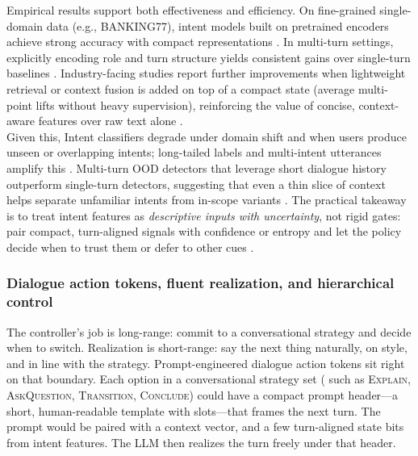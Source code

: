 \documentclass[12pt]{article}
\begin{document}
Empirical results support both effectiveness and efficiency. On fine-grained single-domain data (e.g., BANKING77), intent models built on pretrained encoders achieve strong accuracy with compact representations \citep{casanueva2020banking77}. In multi-turn settings, explicitly encoding role and turn structure yields consistent gains over single-turn baselines \citep{zhang2021dialoguebert}. Industry-facing studies report further improvements when lightweight retrieval or context fusion is added on top of a compact state (average multi-point lifts without heavy supervision), reinforcing the value of concise, context-aware features over raw text alone \citep{liu2024lara}.\\

 Given this, Intent classifiers degrade under domain shift and when users produce unseen or overlapping intents; long-tailed labels and multi-intent utterances amplify this \citep{larson2019evaluating,casanueva2020banking77}. Multi-turn OOD detectors that leverage short dialogue history outperform single-turn detectors, suggesting that even a thin slice of context helps separate unfamiliar intents from in-scope variants \citep{lang2024caro}. The practical takeaway is to treat intent features as \emph{descriptive inputs with uncertainty}, not rigid gates: pair compact, turn-aligned signals with confidence or entropy and let the policy decide when to trust them or defer to other cues \citep{zhang2021intentbert}.


\subsubsection{Dialogue action tokens, fluent realization, and hierarchical control}
\label{sec:dat-templates}

The controller’s job is long-range: commit to a conversational strategy and decide when to switch. Realization is short-range: say the next thing naturally, on style, and in line with the strategy. Prompt-engineered dialogue action tokens sit right on that boundary. Each option in a conversational strategy set ( such as \textsc{Explain}, \textsc{AskQuestion}, \textsc{Transition}, \textsc{Conclude}) could have a compact prompt header—a short, human-readable template with slots—that frames the next turn. The prompt would be paired with a context vector, and a few turn-aligned state bits from intent features. The LLM then realizes the turn freely under that header.\\
\end{document}
